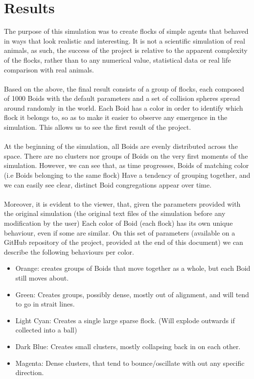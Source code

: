 \documentclass[12pt]{article}
\begin{document}
\section{Results}
The purpose of this simulation was to create flocks of simple agents that behaved in ways that look realistic and interesting. It is not a scientific simulation of real animals, as such, the success of the project is relative to the apparent complexity of the flocks, rather than to any numerical value, statistical data or real life comparison with real animals. 
\\ \\
Based on the above, the final result consists of a group of flocks, each composed of 1000 Boids with the default parameters and a set of collision spheres spread around randomly in the world.
Each Boid has a color in order to identify which flock it belongs to, so as to make it easier to observe any emergence in the simulation. This allows us to see the first result of the project. 
\\ \\
At the beginning of the simulation, all Boids are evenly distributed across the space. There are no clusters nor groups of Boids on the very first moments of the simulation. However, we can see that, as time progresses, Boids of matching color (i.e Boids belonging to the same flock) Have a tendency of grouping together, and we can easily see clear, distinct Boid congregations appear over time. 
\\ \\
Moreover, it is evident to the viewer, that, given the parameters provided with the original simulation (the original text files of the simulation before any modification by the user) Each color of Boid (each flock) has its own unique behaviour, even if some are similar. On this set of parameters (available on a GitHub repository of the project, provided at the end of this document) we can describe the following behaviours per color.
\begin{itemize}
	\item Orange: creates groups of Boids that move together as a whole, but each Boid still moves about.
	
	\item Green: Creates groups, possibly dense, mostly out of alignment, and will tend to go in strait lines.
	
	\item Light Cyan: Creates a single large sparse flock. (Will explode outwards if collected into a ball)
	
	\item Dark Blue: Creates small clusters, mostly collapsing back in on each other.
	
	\item Magenta: Dense clusters, that tend to bounce/oscillate with out any specific direction.
\end{itemize}
\end{document}
